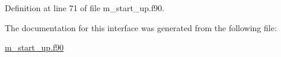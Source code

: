 Definition at line 71 of file m\+\_\+start\+\_\+up.\+f90.



The documentation for this interface was generated from the following file\+:\begin{DoxyCompactItemize}
\item 
\hyperlink{m__start__up_8f90}{m\+\_\+start\+\_\+up.\+f90}\end{DoxyCompactItemize}
